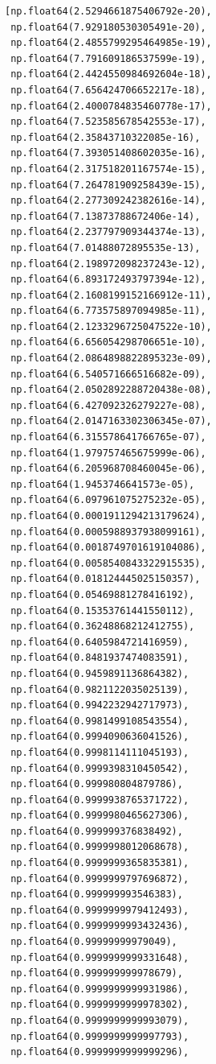 \documentclass[11pt]{article}
\makeatletter
\newcommand{\boxspacing}{\kern\kvtcb@left@rule\kern\kvtcb@boxsep}
\newcommand{\prompt}[4]{
        {\ttfamily\llap{{\color{#2}[#3]:\hspace{3pt}#4}}\vspace{-\baselineskip}}
    }
\makeatother
\begin{document}
            \begin{tcolorbox}[breakable, size=fbox, boxrule=.5pt, pad at break*=1mm, opacityfill=0]
\prompt{Out}{outcolor}{ }{\boxspacing}
\begin{Verbatim}[commandchars=\\\{\}]
[np.float64(2.5294661875406792e-20),
 np.float64(7.929180530305491e-20),
 np.float64(2.4855799295464985e-19),
 np.float64(7.791609186537599e-19),
 np.float64(2.4424550984692604e-18),
 np.float64(7.656424706652217e-18),
 np.float64(2.4000784835460778e-17),
 np.float64(7.523585678542553e-17),
 np.float64(2.35843710322085e-16),
 np.float64(7.393051408602035e-16),
 np.float64(2.317518201167574e-15),
 np.float64(7.264781909258439e-15),
 np.float64(2.277309242382616e-14),
 np.float64(7.13873788672406e-14),
 np.float64(2.237797909344374e-13),
 np.float64(7.01488072895535e-13),
 np.float64(2.198972098237243e-12),
 np.float64(6.893172493797394e-12),
 np.float64(2.1608199152166912e-11),
 np.float64(6.773575897094985e-11),
 np.float64(2.1233296725047522e-10),
 np.float64(6.656054298706651e-10),
 np.float64(2.0864898822895323e-09),
 np.float64(6.540571666516682e-09),
 np.float64(2.0502892288720438e-08),
 np.float64(6.427092326279227e-08),
 np.float64(2.0147163302306345e-07),
 np.float64(6.315578641766765e-07),
 np.float64(1.979757465675999e-06),
 np.float64(6.205968708460045e-06),
 np.float64(1.9453746641573e-05),
 np.float64(6.097961075275232e-05),
 np.float64(0.0001911294213179624),
 np.float64(0.0005988937938099161),
 np.float64(0.0018749701619104086),
 np.float64(0.0058540843322915535),
 np.float64(0.018124445025150357),
 np.float64(0.05469881278416192),
 np.float64(0.15353761441550112),
 np.float64(0.36248868212412755),
 np.float64(0.6405984721416959),
 np.float64(0.8481937474083591),
 np.float64(0.9459891136864382),
 np.float64(0.9821122035025139),
 np.float64(0.9942232942717973),
 np.float64(0.9981499108543554),
 np.float64(0.9994090636041526),
 np.float64(0.9998114111045193),
 np.float64(0.9999398310450542),
 np.float64(0.999980804879786),
 np.float64(0.9999938765371722),
 np.float64(0.9999980465627306),
 np.float64(0.999999376838492),
 np.float64(0.9999998012068678),
 np.float64(0.9999999365835381),
 np.float64(0.9999999797696872),
 np.float64(0.999999993546383),
 np.float64(0.9999999979412493),
 np.float64(0.9999999993432436),
 np.float64(0.99999999979049),
 np.float64(0.9999999999331648),
 np.float64(0.999999999978679),
 np.float64(0.9999999999931986),
 np.float64(0.9999999999978302),
 np.float64(0.9999999999993079),
 np.float64(0.9999999999997793),
 np.float64(0.9999999999999296),

\end{Verbatim}
\end{tcolorbox}
\end{document}

